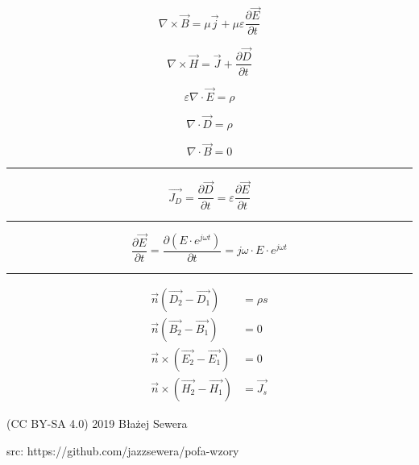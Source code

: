 \documentclass[12pt]{article}
\newenvironment{bottompar}{\par\vspace*{\fill}}{\clearpage}
\newcommand{\grayrule}{{\color{lightgray} \hrule}}
\begin{document}
\begin{multicols}{3}
\begin{equation*}
    \nabla \times \Vec{B} = \mu \Vec{j} + \mu \varepsilon \frac{\partial \Vec{E}}{\partial t}
\end{equation*}

\begin{equation*}
    \nabla \times \Vec{H} = \Vec{J} + \frac{\partial \Vec{D}}{\partial t}
\end{equation*}

\begin{equation*}
    \varepsilon \nabla \cdot \Vec{E} = \rho
\end{equation*}

\begin{equation*}
    \nabla \cdot \Vec{D} = \rho
\end{equation*}

\begin{equation*}
    \nabla \cdot \Vec{B} = 0
\end{equation*}

\grayrule

\begin{equation*}
    \Vec{J_D} = \frac{\partial \Vec{D}}{\partial t}
        = \varepsilon \frac{\partial \Vec{E}}{\partial t}
\end{equation*}

\grayrule

\begin{equation*}
    \frac{\partial \Vec{E}}{\partial t}
        = \frac{\partial (E \cdot e^{j \omega t})}{\partial t}
        = j \omega \cdot E \cdot e^{j \omega t}
\end{equation*}

\grayrule

\begin{equation*}
    \begin{split}
        \Vec{n} (\Vec{D_2} - \Vec{D_1}) &= \rho s \\
        \Vec{n} (\Vec{B_2} - \Vec{B_1}) &= 0 \\
        \Vec{n} \times (\Vec{E_2} - \Vec{E_1}) &= 0 \\
        \Vec{n} \times (\Vec{H_2} - \Vec{H_1}) &= \Vec{J_s}
    \end{split}
\end{equation*}

\end{multicols}

\begin{bottompar}
    {\footnotesize \ttfamily (CC BY-SA 4.0) 2019 Błażej Sewera \par
    src: https://github.com/jazzsewera/pofa-wzory}
\end{bottompar}

\end{document}
